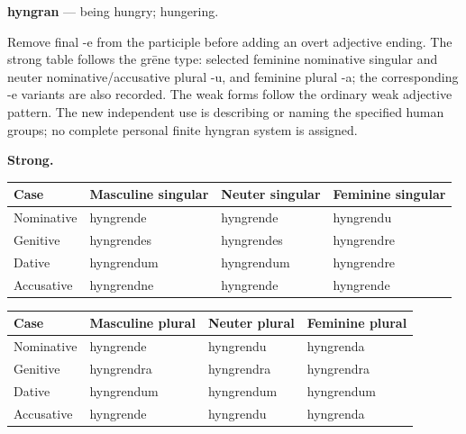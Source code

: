 \par\begin{minipage}{\linewidth}\raggedright
\textbf{hyngran} — being hungry; hungering.

Remove final -e from the participle before adding an overt adjective ending. The strong table follows the grēne type: selected feminine nominative singular and neuter nominative/\allowbreak{}accusative plural -u, and feminine plural -a; the corresponding -e variants are also recorded. The weak forms follow the ordinary weak adjective pattern. The new independent use is describing or naming the specified human groups; no complete personal finite hyngran system is assigned.

\textbf{Strong.}

\par\begingroup
\fontsize{10.5}{13.2}\selectfont
\setlength{\LTleft}{0pt}\setlength{\LTright}{\fill}
\noindent
\begin{tabular}{@{}>{\raggedright\arraybackslash}p{22.0mm}>{\raggedright\arraybackslash}p{31.188mm}>{\raggedright\arraybackslash}p{31.188mm}>{\raggedright\arraybackslash}p{31.188mm}@{}}
\toprule
\textbf{Case} & \textbf{Masculine singular} & \textbf{Neuter singular} & \textbf{Feminine singular} \\
\midrule
Nominative & hyngrende & hyngrende & hyngrendu \\
Genitive & hyngrendes & hyngrendes & hyngrendre \\
Dative & hyngrendum & hyngrendum & hyngrendre \\
Accusative & hyngrendne & hyngrende & hyngrende \\
\bottomrule
\end{tabular}
\par\endgroup
\end{minipage}\par
\par\addvspace{5pt}
\par\begingroup
\fontsize{10.5}{13.2}\selectfont
\setlength{\LTleft}{0pt}\setlength{\LTright}{\fill}
\noindent
\begin{tabular}{@{}>{\raggedright\arraybackslash}p{22.0mm}>{\raggedright\arraybackslash}p{31.188mm}>{\raggedright\arraybackslash}p{31.188mm}>{\raggedright\arraybackslash}p{31.188mm}@{}}
\toprule
\textbf{Case} & \textbf{Masculine plural} & \textbf{Neuter plural} & \textbf{Feminine plural} \\
\midrule
Nominative & hyngrende & hyngrendu & hyngrenda \\
Genitive & hyngrendra & hyngrendra & hyngrendra \\
Dative & hyngrendum & hyngrendum & hyngrendum \\
Accusative & hyngrende & hyngrendu & hyngrenda \\
\bottomrule
\end{tabular}
